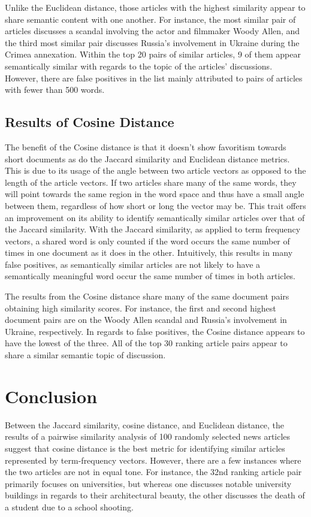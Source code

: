 \documentclass[11pt]{article}
\begin{document}
Unlike the Euclidean distance, those articles with the highest similarity appear to share semantic content with one another.
For instance, the most similar pair of articles discusses a scandal involving the actor and filmmaker Woody Allen, and the third most similar pair discusses Russia's involvement in Ukraine during the Crimea annexation.
Within the top 20 pairs of similar articles, 9 of them appear semantically similar with regards to the topic of the articles' discussions.
However, there are false positives in the list mainly attributed to pairs of articles with fewer than 500 words.

\subsection{Results of Cosine Distance}
The benefit of the Cosine distance is that it doesn't show favoritism towards short documents as do the Jaccard similarity and Euclidean distance metrics.
This is due to its usage of the angle between two article vectors as opposed to the length of the article vectors.
If two articles share many of the same words, they will point towards the same region in the word space and thus have a small angle between them, regardless of how short or long the vector may be.
This trait offers an improvement on its ability to identify semantically similar articles over that of the Jaccard similarity.
With the Jaccard similarity, as applied to term frequency vectors, a shared word is only counted if the word occurs the same number of times in one document as it does in the other.
Intuitively, this results in many false positives, as semantically similar articles are not likely to have a semantically meaningful word occur the same number of times in both articles.

The results from the Cosine distance share many of the same document pairs obtaining high similarity scores. For instance, the first and second highest document pairs are on the Woody Allen scandal and Russia's involvement in Ukraine, respectively.
In regards to false positives, the Cosine distance appears to have the lowest of the three.
All of the top 30 ranking article pairs appear to share a similar semantic topic of discussion.

\section{Conclusion}

Between the Jaccard similarity, cosine distance, and Euclidean distance, the results of a pairwise similarity analysis of 100 randomly selected news articles suggest that cosine distance is the best metric for identifying similar articles represented by term-frequency vectors.
However, there are a few instances where the two articles are not in equal tone. For instance, the 32nd ranking article pair primarily focuses on universities, but whereas one discusses notable university buildings in regards to their architectural beauty, the other discusses the death of a student due to a school shooting.

{}

\end{document}
